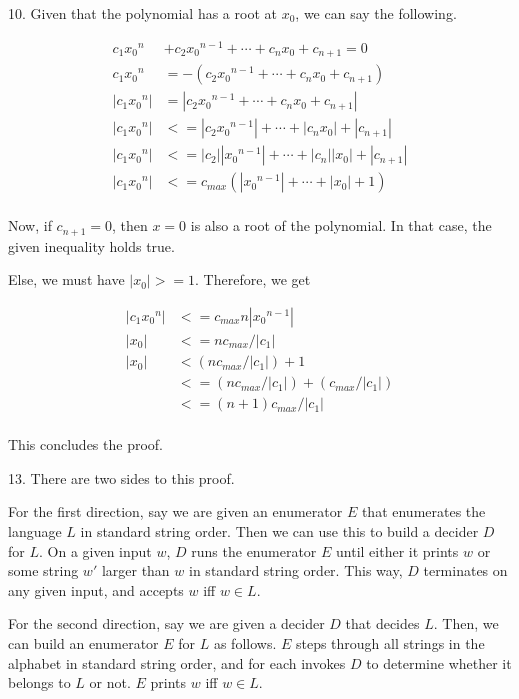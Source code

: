 \documentclass{article}
\begin{document}
10. Given that the polynomial has a root at $x_0$, we can say the following.

\begin{align*}
    c_1 {x_0}^n &+ c_2 {x_0}^{n - 1} + \cdots + c_n x_0 + c_{n + 1} = 0 \\
    c_1 {x_0}^n &= -(c_2 {x_0}^{n - 1} + \cdots + c_n x_0 + c_{n + 1}) \\
    |c_1 {x_0}^n| &= |c_2 {x_0}^{n - 1} + \cdots + c_n x_0 + c_{n + 1}| \\
    |c_1 {x_0}^n| &<= |c_2 {x_0}^{n - 1}| + \cdots + |c_n x_0| + |c_{n + 1}| \\
    |c_1 {x_0}^n| &<= |c_2| |{x_0}^{n - 1}| + \cdots + |c_n| |x_0| + |c_{n + 1}| \\
    |c_1 {x_0}^n| &<= c_{max} (|{x_0}^{n - 1}| + \cdots + |x_0| + 1) \\
\end{align*}

Now, if $c_{n + 1} = 0$, then $x = 0$ is also a root of the polynomial. In that case, the given inequality holds true.

Else, we must have $|x_0| >= 1$. Therefore, we get

\begin{align*}
    |c_1 {x_0}^n| &<= c_{max} n |{x_0}^{n - 1}| \\
    |x_0| &<= n c_{max} / |c_1| \\
    |x_0| &< (n c_{max} / |c_1|) + 1 \\
          &<= (n c_{max} / |c_1|) + (c_{max}/|c_1|) \\
          &<= (n + 1) c_{max} / |c_1| \\
\end{align*}

This concludes the proof.

13. There are two sides to this proof.

For the first direction, say we are given an enumerator $E$ that enumerates the language $L$ in standard string order. Then we can use this to build a decider $D$ for $L$. On a given input $w$, $D$ runs the enumerator $E$ until either it prints $w$ or some string $w'$ larger than $w$ in standard string order. This way, $D$ terminates on any given input, and accepts $w$ iff $w \in L$.

For the second direction, say we are given a decider $D$ that decides $L$. Then, we can build an enumerator $E$ for $L$ as follows. $E$ steps through all strings in the alphabet in standard string order, and for each invokes $D$ to determine whether it belongs to $L$ or not. $E$ prints $w$ iff $w \in L$.
\end{document}
